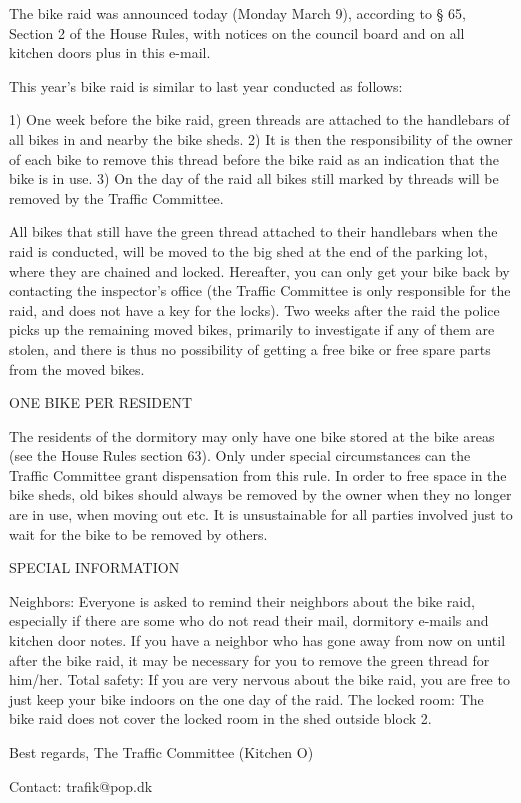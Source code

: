 The bike raid was announced today (Monday March 9), according to § 65, Section 2 of the House Rules, with notices on the council board and on all kitchen doors plus in this e-mail.

This year’s bike raid is similar to last year conducted as follows:

1) One week before the bike raid, green threads are attached to the handlebars of all bikes in and nearby the bike sheds.
2) It is then the responsibility of the owner of each bike to remove this thread before the bike raid as an indication that the bike is in use.
3) On the day of the raid all bikes still marked by threads will be removed by the Traffic Committee.

All bikes that still have the green thread attached to their handlebars when the raid is conducted, will be moved to the big shed at the end of the parking lot, where they are chained and locked. Hereafter, you can only get your bike back by contacting the inspector's office (the Traffic Committee is only responsible for the raid, and does not have a key for the locks). Two weeks after the raid the police picks up the remaining moved bikes, primarily to investigate if any of them are stolen, and there is thus no possibility of getting a free bike or free spare parts from the moved bikes.


ONE BIKE PER RESIDENT

The residents of the dormitory may only have one bike stored at the bike areas (see the House Rules section 63). Only under special circumstances can the Traffic Committee grant dispensation from this rule. In order to free space in the bike sheds, old bikes should always be removed by the owner when they no longer are in use, when moving out etc. It is unsustainable for all parties involved just to wait for the bike to be removed by others.


SPECIAL INFORMATION

Neighbors: Everyone is asked to remind their neighbors about the bike raid, especially if there are some who do not read their mail, dormitory e-mails and kitchen door notes. If you have a neighbor who has gone away from now on until after the bike raid, it may be necessary for you to remove the green thread for him/her.
Total safety: If you are very nervous about the bike raid, you are free to just keep your bike indoors on the one day of the raid.
The locked room: The bike raid does not cover the locked room in the shed outside block 2.


Best regards,
The Traffic Committee (Kitchen O)

Contact: trafik@pop.dk
